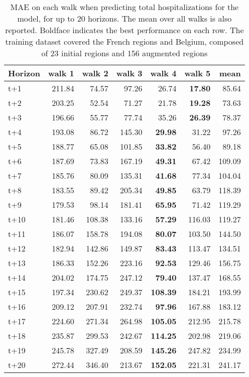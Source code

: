 \begin{table}[H]
\centering
\caption{MAE on each walk when predicting total hospitalizations for the model, for up to 20 horizons. The mean over all walks is also reported. Boldface indicates the best performance on each row. The training dataset covered the French regions and Belgium, composed of 23 initial regions and 156 augmented regions }
\label{tab:MAE_walk_dense_model}
\begin{tabular}{lrrrrrr}
\toprule
Horizon &  walk 1 &  walk 2 &  walk 3 &  walk 4 &  walk 5 &   mean \\
\midrule
t+1  & 211.84  & 74.57  & 97.26  & 26.74  & \textbf{17.80}  & 85.64  \\
t+2  & 203.25  & 52.54  & 71.27  & 21.78  & \textbf{19.28}  & 73.63  \\
t+3  & 196.66  & 55.77  & 77.74  & 35.26  & \textbf{26.39}  & 78.37  \\
t+4  & 193.08  & 86.72  & 145.30  & \textbf{29.98}  & 31.22  & 97.26  \\
t+5  & 188.77  & 65.08  & 101.85  & \textbf{33.82}  & 56.40  & 89.18  \\
t+6  & 187.69  & 73.83  & 167.19  & \textbf{49.31}  & 67.42  & 109.09  \\
t+7  & 185.76  & 80.09  & 135.31  & \textbf{41.68}  & 77.34  & 104.04  \\
t+8  & 183.55  & 89.42  & 205.34  & \textbf{49.85}  & 63.79  & 118.39  \\
t+9  & 179.53  & 98.14  & 181.41  & \textbf{65.95}  & 71.42  & 119.29  \\
t+10  & 181.46  & 108.38  & 133.16  & \textbf{57.29}  & 116.03  & 119.27  \\
t+11  & 186.07  & 158.78  & 194.08  & \textbf{80.07}  & 103.50  & 144.50  \\
t+12  & 182.94  & 142.86  & 149.87  & \textbf{83.43}  & 113.47  & 134.51  \\
t+13  & 186.33  & 152.26  & 223.16  & \textbf{92.53}  & 129.46  & 156.75  \\
t+14  & 204.02  & 174.75  & 247.12  & \textbf{79.40}  & 137.47  & 168.55  \\
t+15  & 197.34  & 230.62  & 249.37  & \textbf{108.39}  & 184.21  & 193.99  \\
t+16  & 209.12  & 207.91  & 232.74  & \textbf{97.96}  & 167.88  & 183.12  \\
t+17  & 224.60  & 271.34  & 264.98  & \textbf{105.05}  & 212.95  & 215.78  \\
t+18  & 235.87  & 299.53  & 242.67  & \textbf{114.25}  & 202.98  & 219.06  \\
t+19  & 245.78  & 327.49  & 208.59  & \textbf{145.26}  & 247.82  & 234.99  \\
t+20  & 272.44  & 346.40  & 213.67  & \textbf{152.05}  & 221.31  & 241.17  \\

\bottomrule
\end{tabular}
\end{table}
